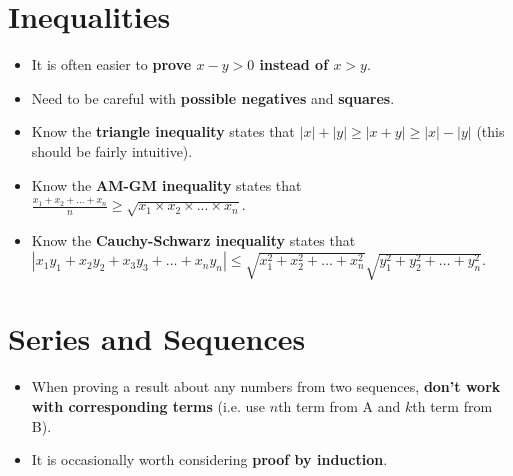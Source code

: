 \documentclass[9pt]{extarticle}
\begin{document}
	\section{Inequalities}
	
	\begin{itemize}
		\item It is often easier to \textbf{prove $x - y > 0$ instead of $x > y$}.
		\item Need to be careful with \textbf{possible negatives} and \textbf{squares}.
		\item Know the \textbf{triangle inequality} states that $|x|+|y| \geq |x+y| \geq |x|-|y|$ (this should be fairly intuitive).
		\item Know the \textbf{AM-GM inequality} states that $\frac{x_1+x_2+...+x_n}{n} \geq \sqrt{x_1\times x_2\times ...\times x_n}$.
		\item Know the \textbf{Cauchy-Schwarz inequality} states that $|x_1y_1 + x_2y_2 + x_3y_3 + \dots + x_ny_n| \leq \sqrt{x_1^2 + x_2^2 + \dots + x_n^2} \sqrt{y_1^2 + y_2^2 + \dots + y_n^2}$.
	\end{itemize}
	
	\section{Series and Sequences}
	
	\begin{itemize}
		\item When proving a result about any numbers from two sequences, \textbf{don't work with corresponding terms} (i.e. use $n$th term from A and $k$th term from B).
		\item It is occasionally worth considering \textbf{proof by induction}.
	\end{itemize}
	
\end{document}
